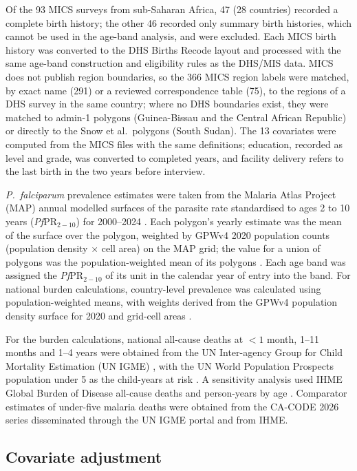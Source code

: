 Of the 93 MICS surveys from sub-Saharan Africa, 47 (28 countries) recorded a complete birth history; the other 46 recorded only summary birth histories, which cannot be used in the age-band analysis, and were excluded. Each MICS birth history was converted to the DHS Births Recode layout and processed with the same age-band construction and eligibility rules as the DHS/MIS data. MICS does not publish region boundaries, so the 366 MICS region labels were matched, by exact name (291) or a reviewed correspondence table (75), to the regions of a DHS survey in the same country; where no DHS boundaries exist, they were matched to admin-1 polygons (Guinea-Bissau and the Central African Republic) or directly to the Snow et al.\ polygons (South Sudan). The 13 covariates were computed from the MICS files with the same definitions; education, recorded as level and grade, was converted to completed years, and facility delivery refers to the last birth in the two years before interview.

\emph{P.\ falciparum} prevalence estimates were taken from the Malaria Atlas Project (MAP) annual modelled surfaces of the parasite rate standardised to ages 2 to 10 years (\textit{Pf}PR$_{2-10}$) for 2000--2024 \cite{map,map2025}. Each polygon's yearly estimate was the mean of the surface over the polygon, weighted by GPWv4 2020 population counts (population density $\times$ cell area) on the MAP grid; the value for a union of polygons was the population-weighted mean of its polygons \cite{gpwv4}. Each age band was assigned the \textit{Pf}PR$_{2-10}$ of its unit in the calendar year of entry into the band. For national burden calculations, country-level prevalence was calculated using population-weighted means, with weights derived from the GPWv4 population density surface for 2020 and grid-cell areas \cite{gpwv4}.

For the burden calculations, national all-cause deaths at $<1$ month, 1--11 months and 1--4 years were obtained from the UN Inter-agency Group for Child Mortality Estimation (UN IGME) \cite{igme}, with the UN World Population Prospects population under 5 as the child-years at risk \cite{wpp}. A sensitivity analysis used IHME Global Burden of Disease all-cause deaths and person-years by age \cite{ihme}. Comparator estimates of under-five malaria deaths were obtained from the CA-CODE 2026 series disseminated through the UN IGME portal \cite{Perin:26,Villavicencio:24} and from IHME.


\subsection*{Covariate adjustment}

